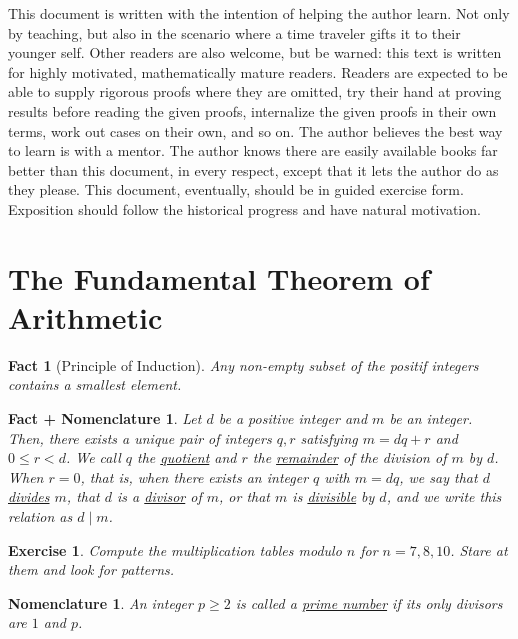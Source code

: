 \documentclass[12pt]{article}
\newtheorem*{fact*}{Fact}
\newtheorem*{nomn*}{Nomenclature}
\newtheorem*{fact_plus_nomn*}{Fact + Nomenclature}
\newtheorem*{exer*}{Exercise}
\begin{document}
This document is written with the intention of helping the author learn. Not only by teaching, but also in the scenario where a time traveler gifts it to their younger self.
Other readers are also welcome, but be warned: this text is written for highly motivated, mathematically mature readers. Readers are expected to be able to supply rigorous proofs where they are omitted, try their hand at proving results before reading the given proofs, internalize the given proofs in their own terms, work out cases on their own, and so on. 
The author believes the best way to learn is with a mentor. The author knows there are easily available books far better than this document, in every respect, except that it lets the author do as they please.
This document, eventually, should be in guided exercise form. Exposition should follow the historical progress and have natural motivation.

\tableofcontents
 

\newpage
\section{The Fundamental Theorem of Arithmetic}


\begin{fact*}[Principle of Induction]
Any non-empty subset of the positif integers contains a smallest element.
\end{fact*}


\begin{fact_plus_nomn*}
Let $d$ be a positive integer and $m$ be an integer. Then, there exists a unique pair of integers $q,r$ satisfying $m=dq+r$ and $0\le r < d$. We call $q$ the \underline{quotient} and $r$ the \underline{remainder} of the division of $m$ by $d$. When $r=0$, that is, when there exists an integer $q$ with $m=dq$, we say that $d$ \underline{divides} $m$, that $d$ is a \underline{divisor} of $m$, or that $m$ is \underline{divisible} by $d$, and we write this relation as $d\mid m$.
\end{fact_plus_nomn*}

\begin{exer*}
Compute the multiplication tables modulo $n$ for $n=7,8,10$. Stare at them and look for patterns.
\end{exer*}

\begin{nomn*}
An integer $p \ge 2$ is called a \underline{prime number} if its only divisors are $1$ and $p$. 
\end{nomn*}
\end{document}
